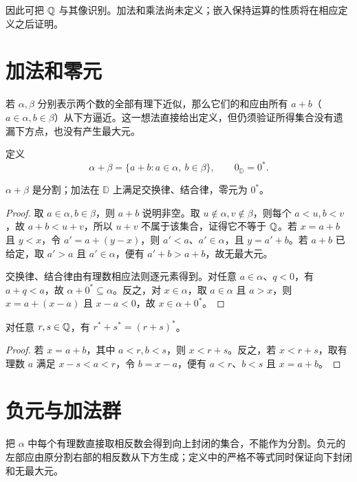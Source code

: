因此可把 \(\mathbb{Q}\) 与其像识别。加法和乘法尚未定义；嵌入保持运算的性质将在相应定义之后证明。

\section{加法和零元}

若 \(\alpha,\beta\) 分别表示两个数的全部有理下近似，那么它们的和应由所有 \(a+b\)（\(a\in\alpha,b\in\beta\)）从下方逼近。这一想法直接给出定义，但仍须验证所得集合没有遗漏下方点，也没有产生最大元。


定义
\[
 \alpha+\beta=\{a+b:a\in\alpha,\ b\in\beta\},\qquad
 0_{\mathbb D}=0^*.
\]

\begin{proposition}
\(\alpha+\beta\) 是分割；加法在 \(\mathbb D\) 上满足交换律、结合律，零元为 \(0^*\)。
\end{proposition}

\begin{proof}
取 \(a\in\alpha,b\in\beta\)，则 \(a+b\) 说明非空。取 \(u\notin\alpha,v\notin\beta\)，则每个 \(a<u,b<v\)，故 \(a+b<u+v\)，所以 \(u+v\) 不属于该集合，证得它不等于 \(\mathbb{Q}\)。若 \(x=a+b\) 且 \(y<x\)，令 \(a'=a+(y-x)\)，则 \(a'<a\)、\(a'\in\alpha\)，且 \(y=a'+b\)。若 \(a+b\) 已给定，取 \(a'>a\) 且 \(a'\in\alpha\)，便有 \(a'+b>a+b\)，故无最大元。

交换律、结合律由有理数相应法则逐元素得到。对任意 \(a\in\alpha\)、\(q<0\)，有 \(a+q<a\)，故 \(\alpha+0^*\subseteq\alpha\)。反之，对 \(x\in\alpha\)，取 \(a\in\alpha\) 且 \(a>x\)，则 \(x=a+(x-a)\) 且 \(x-a<0\)，故 \(x\in\alpha+0^*\)。
\end{proof}

\begin{proposition}
对任意 \(r,s\in\mathbb{Q}\)，有 \(r^*+s^*=(r+s)^*\)。
\end{proposition}

\begin{proof}
若 \(x=a+b\)，其中 \(a<r,b<s\)，则 \(x<r+s\)。反之，若 \(x<r+s\)，取有理数 \(a\) 满足 \(x-s<a<r\)，令 \(b=x-a\)，便有 \(a<r\)、\(b<s\) 且 \(x=a+b\)。
\end{proof}

\section{负元与加法群}

把 \(\alpha\) 中每个有理数直接取相反数会得到向上封闭的集合，不能作为分割。负元的左部应由原分割右部的相反数从下方生成；定义中的严格不等式同时保证向下封闭和无最大元。

